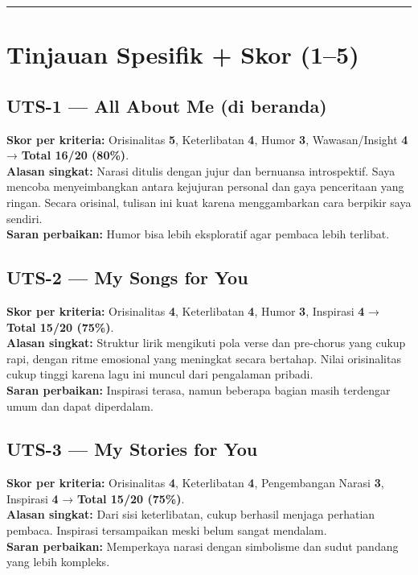 \documentclass[
  letterpaper,
  DIV=11,
  numbers=noendperiod]{scrreprt}
\begin{document}
\begin{center}\rule{0.5\linewidth}{0.5pt}\end{center}

\section{Tinjauan Spesifik + Skor
(1--5)}\label{tinjauan-spesifik-skor-15}

\subsection{UTS-1 --- All About Me (di
beranda)}\label{uts-1-all-about-me-di-beranda}

\textbf{Skor per kriteria:} Orisinalitas \textbf{5}, Keterlibatan
\textbf{4}, Humor \textbf{3}, Wawasan/Insight \textbf{4} → \textbf{Total
16/20 (80\%)}.\\
\textbf{Alasan singkat:} Narasi ditulis dengan jujur dan bernuansa
introspektif. Saya mencoba menyeimbangkan antara kejujuran personal dan
gaya penceritaan yang ringan. Secara orisinal, tulisan ini kuat karena
menggambarkan cara berpikir saya sendiri.\\
\textbf{Saran perbaikan:} Humor bisa lebih eksploratif agar pembaca
lebih terlibat.

\subsection{UTS-2 --- My Songs for You}\label{uts-2-my-songs-for-you-1}

\textbf{Skor per kriteria:} Orisinalitas \textbf{4}, Keterlibatan
\textbf{4}, Humor \textbf{3}, Inspirasi \textbf{4} → \textbf{Total 15/20
(75\%)}.\\
\textbf{Alasan singkat:} Struktur lirik mengikuti pola verse dan
pre-chorus yang cukup rapi, dengan ritme emosional yang meningkat secara
bertahap. Nilai orisinalitas cukup tinggi karena lagu ini muncul dari
pengalaman pribadi.\\
\textbf{Saran perbaikan:} Inspirasi terasa, namun beberapa bagian masih
terdengar umum dan dapat diperdalam.

\subsection{UTS-3 --- My Stories for
You}\label{uts-3-my-stories-for-you-1}

\textbf{Skor per kriteria:} Orisinalitas \textbf{4}, Keterlibatan
\textbf{4}, Pengembangan Narasi \textbf{3}, Inspirasi \textbf{4} →
\textbf{Total 15/20 (75\%)}.\\
\textbf{Alasan singkat:} Dari sisi keterlibatan, cukup berhasil menjaga
perhatian pembaca. Inspirasi tersampaikan meski belum sangat mendalam.\\
\textbf{Saran perbaikan:} Memperkaya narasi dengan simbolisme dan sudut
pandang yang lebih kompleks.
\end{document}
